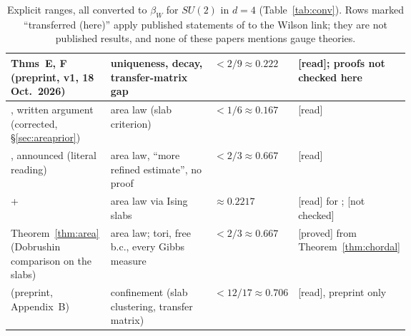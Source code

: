 \documentclass[11pt,a4paper]{article}
\theoremstyle{remark}
\theoremstyle{definition}
\theoremstyle{plain}
\theoremstyle{remark}
\newcommand{\st}[1]{\textsf{[#1]}}
\begin{document}
\begin{table}[htbp]
\begin{tabularx}{\linewidth}{@{}>{\raggedright\arraybackslash}p{0.25\linewidth}>{\raggedright\arraybackslash}X>{\raggedright\arraybackslash}p{0.19\linewidth}>{\raggedright\arraybackslash}p{0.21\linewidth}@{}}
\cite{BB26} Thms~E, F (preprint, v1, 18 Oct.\ 2026) & uniqueness, decay, transfer-matrix gap & $<2/9\approx0.222$ & \st{read}; proofs not checked here\\
\midrule
\cite{DF80}, written argument (corrected, \S\ref{sec:areaprior}) & area law (slab criterion) & $<1/6\approx0.167$ & \st{read}\\
\cite{DF80}, announced (literal reading) & area law, ``more refined estimate'', no proof & $<2/3\approx0.667$ & \st{read}\\
\cite{Fro79} + \cite{ABF87} & area law via Ising slabs & $\approx0.2217$ & \st{read} for \cite{Fro79}; \st{not checked}\\
Theorem~\ref{thm:area} (Dobrushin comparison on the slabs) & area law; tori, free b.c., every Gibbs measure & $<2/3\approx0.667$ & \st{proved} from Theorem~\ref{thm:chordal}\\
\cite{BS83} (preprint, Appendix~B) & confinement (slab clustering, transfer matrix) & $<12/17\approx0.706$ & \st{read}, preprint only\\
\bottomrule
\end{tabularx}
\caption{Explicit ranges, all converted to $\beta_W$ for $SU(2)$ in $d=4$ (Table~\ref{tab:conv}). Rows marked
``transferred (here)'' apply published statements of \cite{Gro79,Sim79,Lev80,Roy86} to the Wilson link;
they are not published results, and none of these papers mentions gauge theories.}
\label{tab:comp}
\end{table}
\end{document}
